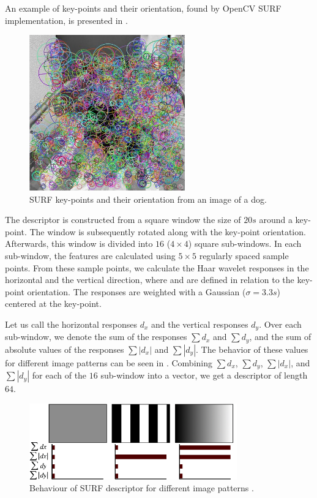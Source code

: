 An example of key-points and their orientation, found by OpenCV SURF implementation, is presented in .
\begin{figure}[ht!]
    \centering
    \includegraphics[width=0.60\textwidth]{Figures/surf/surf_example.jpg}
    \caption[SURF key-points and their orientation from an image of a dog]{SURF key-points and their orientation from an image of a dog.}
    \label{fig:surf_example}
\end{figure}

The descriptor is constructed from a square window the size of $20s$ around a key-point. The window is subsequently rotated along with the key-point orientation. Afterwards, this window is divided into $16$ ($4\times4$) square sub-windows. In each sub-window, the features are calculated using $5\times5$ regularly spaced sample points. From these sample points, we calculate the Haar wavelet responses in the horizontal and the vertical direction, where  and  are defined in relation to the key-point orientation. The responses are weighted with a Gaussian ($\sigma = 3.3s$) centered at the key-point.

Let us call the horizontal responses $d_x$ and the vertical responses $d_y$. Over each sub-window, we denote the sum of the responses $\sum d_x$ and $\sum d_y$, and the sum of absolute values of the responses $\sum |d_x|$ and $\sum |d_y|$. The behavior of these values for different image patterns can be seen in . Combining $\sum d_x$, $\sum d_y$, $\sum |d_x|$, and $\sum |d_y|$ for each of the $16$ sub-window into a vector, we get a descriptor of length $64$.

\begin{figure}
    \centering
    \includegraphics[width=0.8\textwidth]{Figures/surf/surf_descriptor.png}
    \caption[Behaviour of SURF descriptor for different image patterns]{Behaviour of SURF descriptor for different image patterns \cite{Bay2006}.}
    \label{fig:surf_descriptor}
\end{figure}
